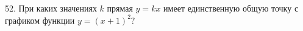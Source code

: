 52. При каких значениях $k$ прямая $y=kx$ имеет единственную общую точку
с графиком функции $y=(x+1)^2?$\\

